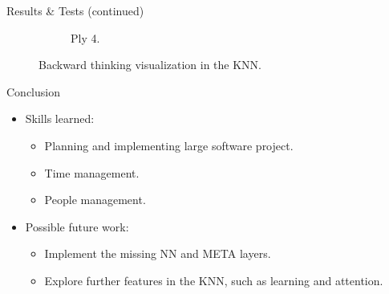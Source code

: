 \documentclass[final]{beamer} %
\begin{document}
\begin{frame}
\begin{columns}
\begin{column}{.3\textwidth}
{\begin{block}{Results \& Tests (continued)}
\begin{figure}[!htb]
\begin{subfigure}[!htb]{0.24\columnwidth}
							\caption{Ply 4.}
						\end{subfigure}
						\caption{Backward thinking visualization in the KNN.}
					\end{figure}
				\end{block}
				\begin{block}{Conclusion}
					\begin{itemize}
						\item Skills learned:
						\begin{itemize}
							\item Planning and implementing large software project.
							\item Time management.
							\item People management.
						\end{itemize}
					
						\item Possible future work:
						\begin{itemize}
							\item Implement the missing NN and META layers.
							\item Explore further features in the KNN, such as learning and attention.
						\end{itemize}
					\end{itemize}
				\end{block}
			}
			\end{column}
		\end{columns}
	\end{frame}
\end{document}
